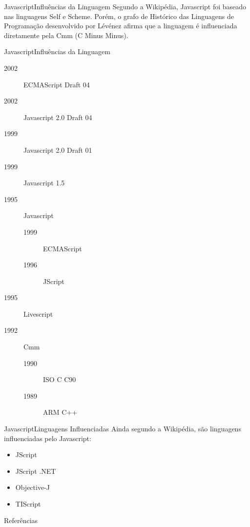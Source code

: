 \documentclass[hyperref={pdfpagelabels=false}]{beamer}
\begin{document}
\begin{frame}{Javascript}{Influências da Linguagem}
    Segundo a Wikipédia\cite{wikipedia}, Javascript foi baseado nas linguagens
    Self e Scheme. Porém, o grafo de Histórico das Linguagens de Programação
    desenvolvido por Lévénez\cite{plotter} afirma que a linguagem é influenciada
    diretamente pela Cmm (C Minus Minus\cite{cmm}).
\end{frame}

\begin{frame}{Javascript}{Influências da Linguagem}
    \begin{description}
    \item[2002] ECMAScript Draft 04
    \item[2002] Javascript 2.0 Draft 04
    \item[1999] Javascript 2.0 Draft 01
    \item[1999] Javascript 1.5
    \item[1995] Javascript
        \begin{description}
        \item[1999] ECMAScript
        \item[1996] JScript
        \end{description}
    \item[1995] Livescript
    \item[1992] Cmm
        \begin{description}
        \item[1990] ISO C C90
        \item[1989] ARM C++
        \end{description}
    \end{description}
\end{frame}

\begin{frame}{Javascript}{Linguagens Influenciadas}
    Ainda segundo a Wikipédia\cite{wikipedia}, são linguagens influenciadas pelo
    Javascript:
    \begin{itemize}
        \item JScript
        \item JScript .NET
        \item Objective-J
        \item TIScript
    \end{itemize}
\end{frame}

\begin{frame}[allowframebreaks]{Referências}
    
    
\end{frame}
\end{document}
